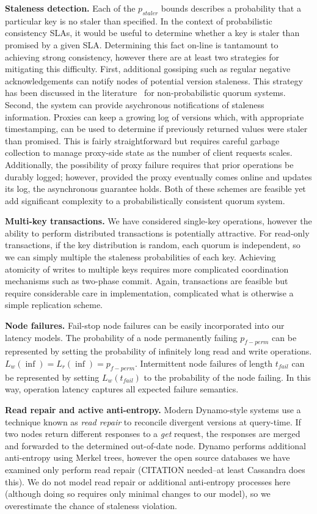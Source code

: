 \documentclass{vldb}
\begin{document}
\textbf{Staleness detection.} Each of the $p_{staler}$ bounds
describes a probability that a particular key is no staler than
specified.  In the context of probabilistic consistency SLAs, it would
be useful to determine whether a key is staler than promised by a
given SLA.  Determining this fact on-line is tantamount to achieving
strong consistency, however there are at least two strategies for
mitigating this difficulty. First, additional gossiping such as
regular negative acknowledgements can notify nodes of potential
version staleness.  This strategy has been discussed in the
literature~\cite{tocite} for non-probabilistic quorum systems.
Second, the system can provide asychronous notifications of staleness
information.  Proxies can keep a growing log of versions which, with
appropriate timestamping, can be used to determine if previously
returned values were staler than promised.  This is fairly
straightforward but requires careful garbage collection to manage
proxy-side state as the number of client requests scales.
Additionally, the possibility of proxy failure requires that prior
operations be durably logged; however, provided the proxy eventually
comes online and updates its log, the asynchronous guarantee holds.
Both of these schemes are feasible yet add significant complexity to a
probabilistically consistent quorum system.

\textbf{Multi-key transactions.} We have considered single-key operations,
however the ability to perform distributed transactions is potentially
attractive.  For read-only transactions, if the key distribution is
random, each quorum is independent, so we can simply multiple the
staleness probabilities of each key.  Achieving atomicity of writes to
multiple keys requires more complicated coordination mechanisms such
as two-phase commit.  Again, transactions are feasible but require
considerable care in implementation, complicated what is otherwise a
simple replication scheme.

\textbf{Node failures.} Fail-stop node failures can be easily
incorporated into our latency models. The probability of a node
permanently failing $p_{f-perm}$ can be represented by setting the
probability of infinitely long read and write
operations. $L_{w}(\inf)=L_{r}(\inf)=p_{f-perm}$.  Intermittent node
failures of length $t_{fail}$ can be represented by setting
$L_{w}(t_{fail})$ to the probability of the node failing.  In this
way, operation latency captures all expected failure semantics.

\textbf{Read repair and active anti-entropy.} Modern Dynamo-style
systems use a technique known as \textit{read repair} to reconcile
divergent versions at query-time.  If two nodes return different
responses to a \textit{get} request, the responses are merged and
forwarded to the determined out-of-date node.  Dynamo performs
additional anti-entropy using Merkel trees, however the open source
databases we have examined only perform read repair (CITATION
needed--at least Cassandra does this). We do not model read repair or
additional anti-entropy processes here (although doing so requires
only minimal changes to our model), so we overestimate the chance of
staleness violation.
\end{document}
